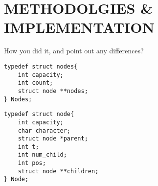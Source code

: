 \chapter{METHODOLGIES \& IMPLEMENTATION}



How you did it, and point out any differences?

\begin{lstlisting}[caption={Struct used in code to store all \textit{trees}}]
typedef struct nodes{
    int capacity;
    int count;
    struct node **nodes;
} Nodes;
\end{lstlisting}

\begin{lstlisting}[caption={Struct used in \textit{trees}}]
typedef struct node{
    int capacity;
    char character;
    struct node *parent;
    int t;
    int num_child;
    int pos;
    struct node **children;
} Node;
\end{lstlisting}